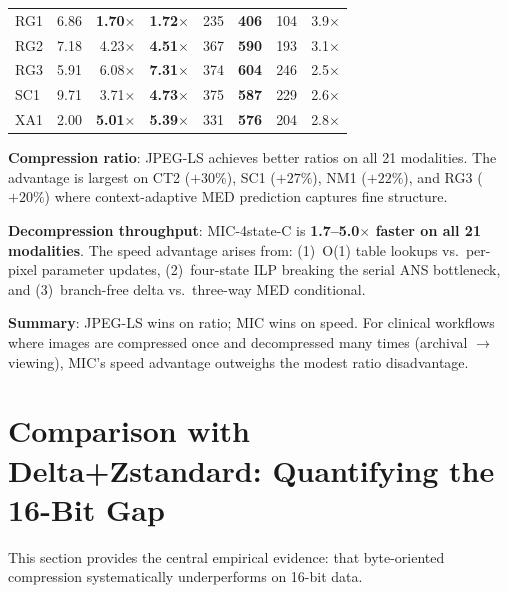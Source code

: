 \documentclass[10pt,twocolumn]{article}
\begin{document}
\begin{table}[t]
\begin{tabular}{lrrrrrrl}
    RG1 & 6.86 & \textbf{1.70$\times$} & \textbf{1.72$\times$} & 235 & \textbf{406} & 104 & 3.9$\times$ \\
    RG2 & 7.18 & 4.23$\times$ & \textbf{4.51$\times$} & 367 & \textbf{590} & 193 & 3.1$\times$ \\
    RG3 & 5.91 & 6.08$\times$ & \textbf{7.31$\times$} & 374 & \textbf{604} & 246 & 2.5$\times$ \\
    SC1 & 9.71 & 3.71$\times$ & \textbf{4.73$\times$} & 375 & \textbf{587} & 229 & 2.6$\times$ \\
    XA1 & 2.00 & \textbf{5.01$\times$} & \textbf{5.39$\times$} & 331 & \textbf{576} & 204 & 2.8$\times$ \\
    \bottomrule
  \end{tabular}
\end{table}

\textbf{Compression ratio}: JPEG-LS achieves better ratios on all 21 modalities. The advantage is largest on CT2 ($+30\%$), SC1 ($+27\%$), NM1 ($+22\%$), and RG3 ($+20\%$) where context-adaptive MED prediction captures fine structure.

\textbf{Decompression throughput}: MIC-4state-C is \textbf{1.7--5.0$\times$ faster on all 21 modalities}. The speed advantage arises from: (1)~O(1) table lookups vs.\ per-pixel parameter updates, (2)~four-state ILP breaking the serial ANS bottleneck, and (3)~branch-free delta vs.\ three-way MED conditional.

\textbf{Summary}: JPEG-LS wins on ratio; MIC wins on speed. For clinical workflows where images are compressed once and decompressed many times (archival $\to$ viewing), MIC's speed advantage outweighs the modest ratio disadvantage.

\section{Comparison with Delta+Zstandard: Quantifying the 16-Bit Gap}
\label{sec:zstd}

This section provides the central empirical evidence: that byte-oriented compression systematically underperforms on 16-bit data.
\end{document}
